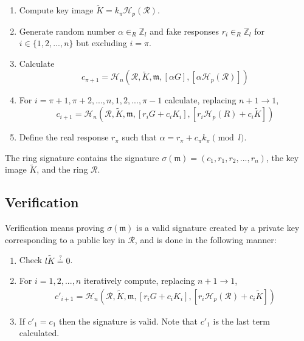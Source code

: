 \begin{enumerate}
	\item Compute key image \(\tilde{K} = k_\pi \mathcal{H}_p(\mathcal{R})\).
	
	\item Generate random number \(\alpha \in_R \mathbb{Z}_l\) and fake responses  \(r_i \in_R \mathbb{Z}_l\) for \(i \in \{1, 2, ..., n\}\) but excluding \(i = \pi\).
	
	\item Calculate
	\[c_{\pi+1} = \mathcal{H}_n(\mathcal{R}, \tilde{K}, \mathfrak{m}, [\alpha G], [\alpha \mathcal{H}_p(\mathcal{R})])\]
	
	\item For \(i = \pi+1, \pi+2, ..., n, 1, 2, ..., \pi-1\) calculate, replacing \(n + 1 \rightarrow 1\),\vspace{.2cm}
	\[  c_{i+1} = \mathcal{H}_n(\mathcal{R}, \tilde{K}, \mathfrak{m}, [r_i G + c_i K_i], [r_i \mathcal{H}_p(R) + c_i \tilde{K}])  \] 
	
	
	\item Define the real response $r_\pi$ such that \(\alpha = r_\pi + c_\pi k_\pi \pmod l\).
	
\end{enumerate}

The ring signature contains the signature \(\sigma(\mathfrak{m}) = (c_1, r_1, r_2, ..., r_n) \), the key image $\tilde{K}$, and the ring $\mathcal{R}$.

\subsection*{Verification}

Verification means proving $\sigma(\mathfrak{m})$ is a valid signature created by a private key corresponding to a public key in $\mathcal{R}$, and is done in the following manner:

\begin{enumerate}
    \item Check $l \tilde{K} \stackrel{?}{=} 0$.
	\item  For \(i = 1, 2, ..., n\) iteratively compute, replacing \(n + 1 \rightarrow 1\),\vspace{.2cm}
	\begin{align*}
	c'_{i+1}   = \mathcal{H}_n(\mathcal{R}, \tilde{K}, \mathfrak{m}, [r_i G + c_i {K_i}], [r_i \mathcal{H}_p(\mathcal{R}) + c_i \tilde{K}])
	\end{align*}
	
	\item If \(c'_1 = c_1\) then the signature is valid. Note that $c'_1$ is the last term calculated.
\end{enumerate}

